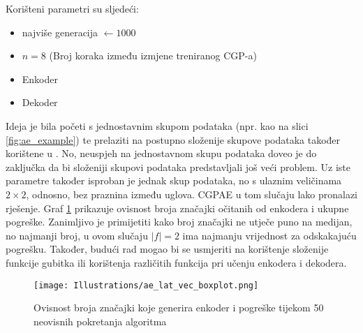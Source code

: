 Korišteni parametri su sljedeći:
\begin{itemize}
	\item {najviše generacija $\leftarrow 1000$}
	\item {$n = 8$ (Broj koraka između izmjene treniranog CGP-a)}
	\item {Enkoder}
	\item {Dekoder}
\end{itemize}
Ideja je bila početi s jednostavnim skupom podataka (npr. kao na slici \ref{fig:ae_example}) te prelaziti na postupno složenije skupove podataka također korištene u \cite{why_ae_diff}.
No, neuspjeh na jednostavnom skupu podataka doveo je do zaključka da bi složeniji skupovi podataka predstavljali još veći problem.
Uz iste parametre također isproban je jednak skup podataka, no s ulaznim veličinama $2 \times 2$, odnosno, bez praznina između uglova.
CGPAE u tom slučaju lako pronalazi rješenje.
Graf \ref{fig:ae_boxplot} prikazuje ovisnost broja značajki očitanih od enkodera i ukupne pogreške.
Zanimljivo je primijetiti kako broj značajki ne utječe puno na medijan, no najmanji broj, u ovom slučaju $|f| = 2$ ima najmanju vrijednost za odskakajuću pogrešku.
Također, budući rad mogao bi se usmjeriti na korištenje složenije funkcije gubitka ili korištenja različitih funkcija pri učenju enkodera i dekodera.

\begin{figure}[H]
	\centering
	\texttt{[image: Illustrations/ae\_lat\_vec\_boxplot.png]}
	\caption{Ovisnost broja značajki koje generira enkoder i pogreške tijekom 50 neovisnih pokretanja algoritma}
	\label{fig:ae_boxplot}
\end{figure}
